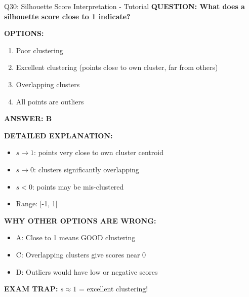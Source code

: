 \documentclass[8pt]{beamer}
\begin{document}
	\begin{frame}{Q30: Silhouette Score Interpretation - Tutorial}
		\fontsize{6.5}{7.5}\selectfont
		\textbf{QUESTION: What does a silhouette score close to 1 indicate?}
		
		\vspace{0.1cm}
		\textbf{OPTIONS:}
		\begin{enumerate}
			\item Poor clustering
			\item Excellent clustering (points close to own cluster, far from others)
			\item Overlapping clusters
			\item All points are outliers
		\end{enumerate}
		
		\vspace{0.1cm}
		\textcolor{myblue}{\textbf{ANSWER: B}}
		
		\vspace{0.1cm}
		\textbf{DETAILED EXPLANATION:}
		\begin{itemize}
			\item $s \to 1$: points very close to own cluster centroid
			\item $s \to 0$: clusters significantly overlapping
			\item $s < 0$: points may be mis-clustered
			\item Range: [-1, 1]
		\end{itemize}
		
		\vspace{0.1cm}
		\textcolor{myred}{\textbf{WHY OTHER OPTIONS ARE WRONG:}}
		\begin{itemize}
			\item \textcolor{myred}{A:} Close to 1 means GOOD clustering
			\item \textcolor{myred}{C:} Overlapping clusters give scores near 0
			\item \textcolor{myred}{D:} Outliers would have low or negative scores
		\end{itemize}
		
		\textcolor{myred}{\textbf{EXAM TRAP:}} $s \approx 1$ = \textcolor{myblue}{excellent clustering}!
	\end{frame}
	
\end{document}
